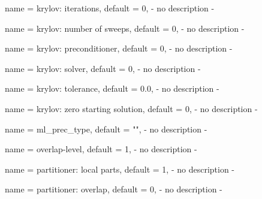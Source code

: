 \begin{parameter}{
    name    = {krylov: iterations},
    default = {0},
}
- no description -
\end{parameter}

\begin{parameter}{
    name    = {krylov: number of sweeps},
    default = {0},
}
- no description -
\end{parameter}

\begin{parameter}{
    name    = {krylov: preconditioner},
    default = {0},
}
- no description -
\end{parameter}

\begin{parameter}{
    name    = {krylov: solver},
    default = {0},
}
- no description -
\end{parameter}

\begin{parameter}{
    name    = {krylov: tolerance},
    default = {0.0},
}
- no description -
\end{parameter}

\begin{parameter}{
    name    = {krylov: zero starting solution},
    default = {0},
}
- no description -
\end{parameter}

\begin{parameter}{
    name    = {ml_prec_type},
    default = {""},
}
- no description -
\end{parameter}

\begin{parameter}{
    name    = {overlap-level},
    default = {1},
}
- no description -
\end{parameter}

\begin{parameter}{
    name    = {partitioner: local parts},
    default = {1},
}
- no description -
\end{parameter}

\begin{parameter}{
    name    = {partitioner: overlap},
    default = {0},
}
- no description -
\end{parameter}

